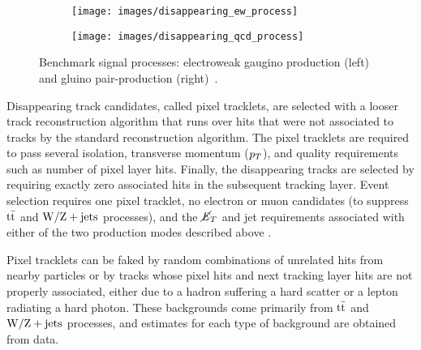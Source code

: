 \documentclass[12pt]{article}
\begin{document}
        \noindent \begin{figure}[htbp] \begin{center}
        \begin{subfigure}[htbp]{0.2\textwidth} \begin{center}
        \texttt{[image: images/disappearing\_ew\_process]}
        \end{center} \end{subfigure}
        \qquad
        \begin{subfigure}[htbp]{0.2\textwidth} \begin{center}
        \texttt{[image: images/disappearing\_qcd\_process]}
        \end{center} \end{subfigure}
            \caption{Benchmark signal processes: electroweak gaugino production (left) and gluino pair-production (right)~\cite{atlas_disappearing}.}
        \label{disappearing_processes}
        \end{center} \end{figure}

        Disappearing track candidates, called pixel tracklets, are selected with a looser track reconstruction algorithm that runs over hits that were not associated to tracks by the standard reconstruction algorithm. The pixel tracklets are required to pass several isolation, transverse momentum ($p_T$), and quality requirements such as number of pixel layer hits. Finally, the disappearing tracks are selected by requiring exactly zero associated hits in the subsequent tracking layer. Event selection requires one pixel tracklet, no electron or muon candidates (to suppress $\mathrm{t}\bar{\mathrm{t}}$ and $\mathrm{W}/\mathrm{Z} + \mathrm{jets}$ processes), and the $\cancel{\it{E}}_{T}$ and jet requirements associated with either of the two production modes described above .
        
        Pixel tracklets can be faked by random combinations of unrelated hits from nearby particles or by tracks whose pixel hits and next tracking layer hits are not properly associated, either due to a hadron suffering a hard scatter or a lepton radiating a hard photon. These backgrounds come primarily from $\mathrm{t}\bar{\mathrm{t}}$ and $\mathrm{W}/\mathrm{Z} + \mathrm{jets}$ processes, and estimates for each type of background are obtained from data. 
\end{document}
